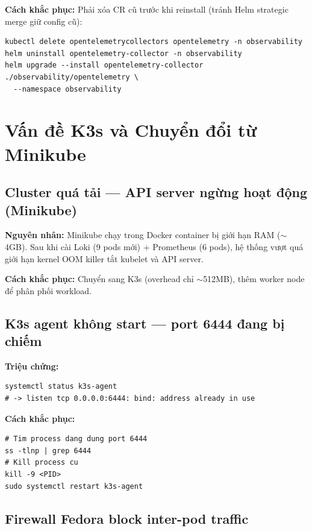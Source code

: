 \textbf{Cách khắc phục:} Phải xóa CR cũ trước khi reinstall (tránh Helm strategic merge giữ config cũ):
\begin{lstlisting}[style=bashstyle]
kubectl delete opentelemetrycollectors opentelemetry -n observability
helm uninstall opentelemetry-collector -n observability
helm upgrade --install opentelemetry-collector ./observability/opentelemetry \
  --namespace observability
\end{lstlisting}

\section{Vấn đề K3s và Chuyển đổi từ Minikube}

\subsection{Cluster quá tải — API server ngừng hoạt động (Minikube)}

\textbf{Nguyên nhân:} Minikube chạy trong Docker container bị giới hạn RAM ($\sim$4GB).
Sau khi cài Loki (9 pods mới) + Prometheus (6 pods), hệ thống vượt quá giới hạn
\textrightarrow{} kernel OOM killer tắt kubelet và API server.

\textbf{Cách khắc phục:} Chuyển sang K3s (overhead chỉ $\sim$512MB), thêm worker node
để phân phối workload.

\subsection{K3s agent không start — port 6444 đang bị chiếm}

\textbf{Triệu chứng:}
\begin{lstlisting}[style=bashstyle]
systemctl status k3s-agent
# -> listen tcp 0.0.0.0:6444: bind: address already in use
\end{lstlisting}

\textbf{Cách khắc phục:}
\begin{lstlisting}[style=bashstyle]
# Tim process dang dung port 6444
ss -tlnp | grep 6444
# Kill process cu
kill -9 <PID>
sudo systemctl restart k3s-agent
\end{lstlisting}

\subsection{Firewall Fedora block inter-pod traffic}

